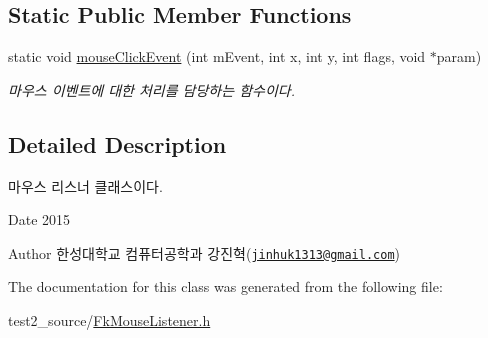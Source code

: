 \subsection*{Static Public Member Functions}
\begin{DoxyCompactItemize}
\item 
\hypertarget{class_fk_mouse_listener_ae60c41717ff59986244d5b396f622b41}{}static void \hyperlink{class_fk_mouse_listener_ae60c41717ff59986244d5b396f622b41}{mouse\+Click\+Event} (int m\+Event, int x, int y, int flags, void $\ast$param)\label{class_fk_mouse_listener_ae60c41717ff59986244d5b396f622b41}

\begin{DoxyCompactList}\small\item\em 마우스 이벤트에 대한 처리를 담당하는 함수이다. \end{DoxyCompactList}\end{DoxyCompactItemize}


\subsection{Detailed Description}
마우스 리스너 클래스이다. 

\begin{DoxyDate}{Date}
2015 
\end{DoxyDate}
\begin{DoxyAuthor}{Author}
한성대학교 컴퓨터공학과 강진혁(\href{mailto:jinhuk1313@gmail.com}{\tt jinhuk1313@gmail.\+com}) 
\end{DoxyAuthor}


The documentation for this class was generated from the following file\+:\begin{DoxyCompactItemize}
\item 
test2\+\_\+source/\hyperlink{_fk_mouse_listener_8h}{Fk\+Mouse\+Listener.\+h}\end{DoxyCompactItemize}
